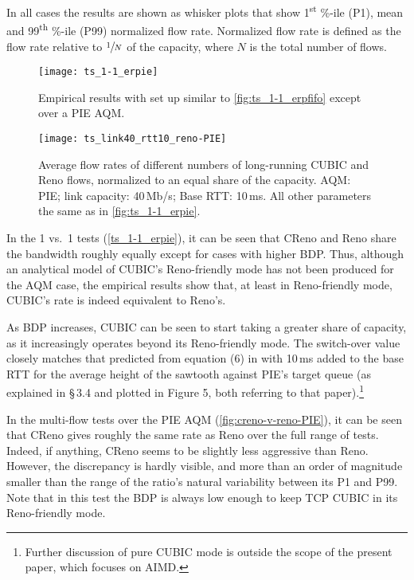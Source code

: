 In all cases the results are shown as whisker plots that show 1\textsuperscript{st} \%-ile (P1), mean and 99\textsuperscript{th} \%-ile (P99) normalized flow rate. Normalized flow rate is defined as the flow rate relative to \(\sfrac{1}{N}\) of the capacity, where \(N\) is the total number of flows.

\begin{figure}
	\centering
	\texttt{[image: ts\_1-1\_erpie]}
	\caption{Empirical results with set up similar to \autoref{fig:ts_1-1_erpfifo} except over a PIE AQM.}\label{fig:ts_1-1_erpie}
\end{figure}

\begin{figure}
	\centering
	\texttt{[image: ts\_link40\_rtt10\_reno-PIE]}
	\caption{Average flow rates of different numbers of long-running CUBIC and Reno flows, normalized to an equal share of the capacity. AQM: PIE; link capacity: 40\,Mb/s; Base RTT: 10\,ms. All other parameters the same as in \autoref{fig:ts_1-1_erpie}.}\label{fig:creno-v-reno-PIE}
\end{figure}

In the 1 vs.\ 1 tests (\autoref{ts_1-1_erpie}), it can be seen that CReno and Reno share the bandwidth roughly equally except for cases with higher BDP. Thus, although an analytical model of CUBIC's Reno-friendly mode has not been produced for the AQM case, the empirical results show that, at least in Reno-friendly mode, CUBIC's rate is indeed equivalent to Reno's.

As BDP increases, CUBIC can be seen to start taking a greater share of capacity, as it increasingly operates beyond its Reno-friendly mode. The switch-over value closely matches that predicted from equation (6) in \cite{Briscoe21c:pi2param} with 10\,ms added to the base RTT for the average height of the sawtooth against PIE's target queue (as explained in \S\,3.4 and plotted in Figure 5, both referring to that paper).\footnote{Further discussion of pure CUBIC mode is outside the scope of the present paper, which focuses on AIMD.}

In the multi-flow tests over the PIE AQM (\autoref{fig:creno-v-reno-PIE}), it can be seen that CReno gives roughly the same rate as Reno over the full range of tests. Indeed, if anything, CReno seems to be slightly less aggressive than Reno. However, the discrepancy is hardly visible, and more than an order of magnitude smaller than the range of the ratio's natural variability between its P1 and P99. Note that in this test the BDP is always low enough to keep TCP CUBIC in its Reno-friendly mode.



